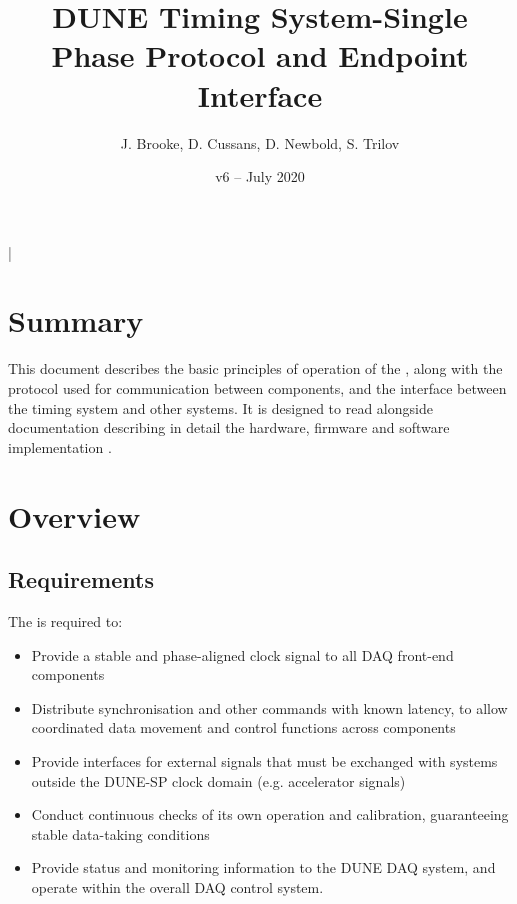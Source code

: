 \documentclass{dune}
\begin{document}

\lstMakeShortInline[columns=fixed]|

\title{DUNE Timing System-Single Phase Protocol and Endpoint Interface}
\author{J. Brooke, D. Cussans, D. Newbold, S. Trilov}
\date{v6 -- July 2020}

\maketitle
\tableofcontents


\section*{Summary}

This document describes the basic principles of operation of the , along with the protocol used for communication between components, and the interface between the timing system and other systems. It is designed to read alongside documentation describing in detail the hardware, firmware and software implementation \cite{ref:dts-sp-description} \cite{ref:dts-sp-firmware} \cite{ref:dts-sp-timing-software}.

\section{Overview}
\subsection{Requirements}

The  is required to:
\begin{itemize}
	\item Provide a stable and phase-aligned clock signal to all DAQ front-end components
	\item Distribute synchronisation and other commands with known latency, to allow coordinated data movement and control functions across components
	\item Provide interfaces for external signals that must be exchanged with systems outside the DUNE-SP clock domain (e.g. accelerator signals)
	\item Conduct continuous checks of its own operation and calibration, guaranteeing stable data-taking conditions
	\item Provide status and monitoring information to the DUNE DAQ system, and operate within the overall DAQ control system.
\end{itemize}
\end{document}
